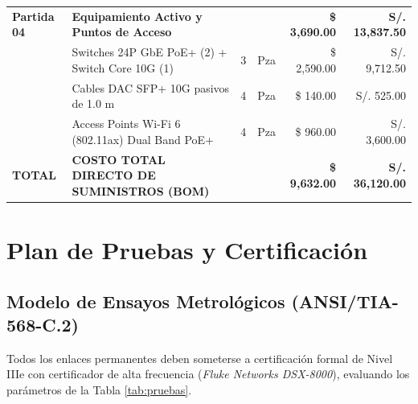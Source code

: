 \documentclass[11pt,a4paper]{article}
\begin{document}
\begin{table}[h!]
\begin{tabularx}{\textwidth}{l l c c r r}
\midrule
\textbf{Partida 04} & \textbf{Equipamiento Activo y Puntos de Acceso} & & & \textbf{\$ 3,690.00} & \textbf{S/. 13,837.50} \\
& Switches 24P GbE PoE+ (2) + Switch Core 10G (1) & 3 & Pza & \$ 2,590.00 & S/. 9,712.50 \\
& Cables DAC SFP+ 10G pasivos de 1.0 m & 4 & Pza & \$ 140.00 & S/. 525.00 \\
& Access Points Wi-Fi 6 (802.11ax) Dual Band PoE+ & 4 & Pza & \$ 960.00 & S/. 3,600.00 \\
\midrule
\textbf{TOTAL} & \textbf{COSTO TOTAL DIRECTO DE SUMINISTROS (BOM)} & & & \textbf{\$ 9,632.00} & \textbf{S/. 36,120.00} \\
\bottomrule
\end{tabularx}
\end{table}

\section{Plan de Pruebas y Certificación}

\subsection{Modelo de Ensayos Metrológicos (ANSI/TIA-568-C.2)}
Todos los enlaces permanentes deben someterse a certificación formal de Nivel IIIe con certificador de alta frecuencia (\textit{Fluke Networks DSX-8000}), evaluando los parámetros de la Tabla \ref{tab:pruebas}.
\end{document}
